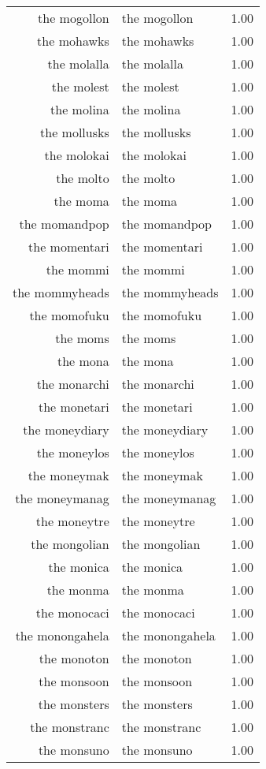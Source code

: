 \begin{table}[ht]
\begin{tabular}{rlr}
  the mogollon & the mogollon & 1.00 \\ 
  the mohawks & the mohawks & 1.00 \\ 
  the molalla & the molalla & 1.00 \\ 
  the molest & the molest & 1.00 \\ 
  the molina & the molina & 1.00 \\ 
  the mollusks & the mollusks & 1.00 \\ 
  the molokai & the molokai & 1.00 \\ 
  the molto & the molto & 1.00 \\ 
  the moma & the moma & 1.00 \\ 
  the momandpop & the momandpop & 1.00 \\ 
  the momentari & the momentari & 1.00 \\ 
  the mommi & the mommi & 1.00 \\ 
  the mommyheads & the mommyheads & 1.00 \\ 
  the momofuku & the momofuku & 1.00 \\ 
  the moms & the moms & 1.00 \\ 
  the mona & the mona & 1.00 \\ 
  the monarchi & the monarchi & 1.00 \\ 
  the monetari & the monetari & 1.00 \\ 
  the moneydiary & the moneydiary & 1.00 \\ 
  the moneylos & the moneylos & 1.00 \\ 
  the moneymak & the moneymak & 1.00 \\ 
  the moneymanag & the moneymanag & 1.00 \\ 
  the moneytre & the moneytre & 1.00 \\ 
  the mongolian & the mongolian & 1.00 \\ 
  the monica & the monica & 1.00 \\ 
  the monma & the monma & 1.00 \\ 
  the monocaci & the monocaci & 1.00 \\ 
  the monongahela & the monongahela & 1.00 \\ 
  the monoton & the monoton & 1.00 \\ 
  the monsoon & the monsoon & 1.00 \\ 
  the monsters & the monsters & 1.00 \\ 
  the monstranc & the monstranc & 1.00 \\ 
  the monsuno & the monsuno & 1.00 \\ 

\end{tabular}
\end{table}
